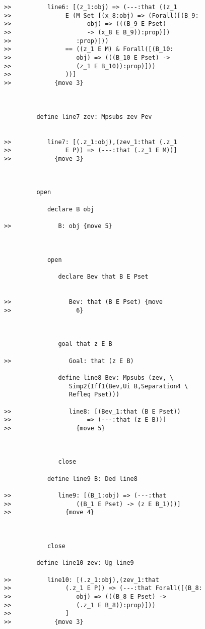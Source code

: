 \documentclass[12pt]{article}
\begin{document}
\begin{verbatim}
>>          line6: [(z_1:obj) => (---:that ((z_1
>>               E (M Set [(x_8:obj) => (Forall([(B_9:
>>                     obj) => (((B_9 E Pset)
>>                     -> (x_8 E B_9)):prop)])
>>                  :prop)]))
>>               == ((z_1 E M) & Forall([(B_10:
>>                  obj) => (((B_10 E Pset) ->
>>                  (z_1 E B_10)):prop)]))
>>               ))]
>>            {move 3}



         define line7 zev: Mpsubs zev Pev


>>          line7: [(.z_1:obj),(zev_1:that (.z_1
>>               E P)) => (---:that (.z_1 E M))]
>>            {move 3}



         open

            declare B obj

>>             B: obj {move 5}



            open

               declare Bev that B E Pset


>>                Bev: that (B E Pset) {move
>>                  6}



               goal that z E B

>>                Goal: that (z E B)

               define line8 Bev: Mpsubs (zev, \
                  Simp2(Iff1(Bev,Ui B,Separation4 \
                  Refleq Pset)))

>>                line8: [(Bev_1:that (B E Pset))
>>                     => (---:that (z E B))]
>>                  {move 5}



               close

            define line9 B: Ded line8

>>             line9: [(B_1:obj) => (---:that
>>                  ((B_1 E Pset) -> (z E B_1)))]
>>               {move 4}



            close

         define line10 zev: Ug line9

>>          line10: [(.z_1:obj),(zev_1:that
>>               (.z_1 E P)) => (---:that Forall([(B_8:
>>                  obj) => (((B_8 E Pset) ->
>>                  (.z_1 E B_8)):prop)]))
>>               ]
>>            {move 3}




\end{verbatim}
\end{document}
